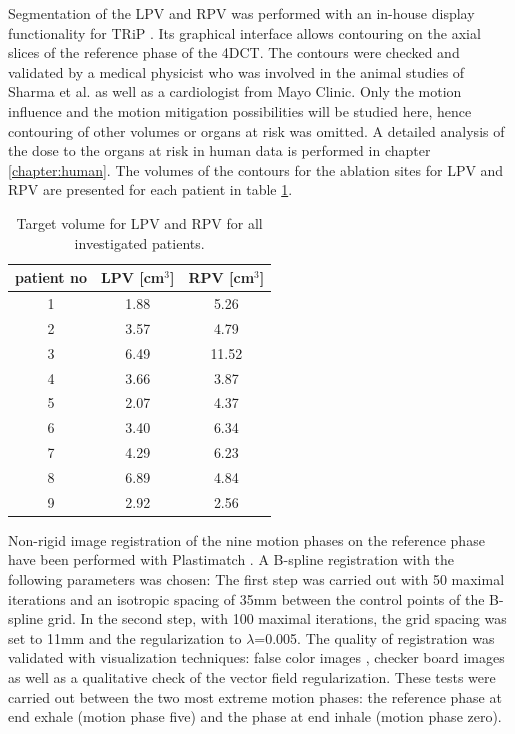 \newpage

Segmentation of the LPV and RPV was performed with an in-house display functionality for TRiP \cite{Hil09}. Its graphical interface 
allows contouring on the axial slices of the reference phase of the 4DCT. The contours were checked and validated by a medical physicist 
who was involved in the animal studies of Sharma et al. \cite{Sha10} as well as a cardiologist from Mayo Clinic. Only the motion influence 
and the motion mitigation possibilities will be studied here, hence contouring of other volumes or organs at risk was omitted. A detailed 
analysis of the dose to the organs at risk in human data is performed in chapter \ref{chapter:human}. The volumes of the contours for the 
ablation sites for LPV and RPV are presented for each patient in table \ref{tab:volume}. 

\begin{table}[H]
  \centering
  \caption{Target volume for LPV and RPV for all investigated patients.}
  \begin{tabular}{|c|c|c|}
    \hline\hline
    patient no & LPV [cm$^{3}$] & RPV [cm$^{3}$]\\
    \hline
    1 & 1.88 & 5.26 \\
    2 & 3.57 & 4.79 \\
    3 & 6.49 & 11.52 \\
    4 & 3.66 & 3.87 \\
    5 & 2.07 & 4.37 \\
    6 & 3.40 & 6.34 \\
    7 & 4.29 & 6.23 \\
    8 & 6.89 & 4.84 \\
    9 & 2.92 & 2.56 \\
    \hline\hline
  \end{tabular}
  \label{tab:volume}
\end{table}

Non-rigid image registration of the nine motion phases on the reference phase have been performed with Plastimatch \cite{Sharp07, Shack10}. 
A B-spline registration with the following parameters was chosen: The first step was carried out with 50 maximal iterations and an isotropic 
spacing of 35mm between the control points of the B-spline grid. In the second step, with 100 maximal iterations, the grid 
spacing was set to 11mm and the regularization to $\lambda$=0.005. 
The quality of registration was validated with visualization techniques: false color images \cite{Bro07}, checker board images 
\cite{Bro07} as well as a qualitative check of the vector field regularization. These tests were carried out between the two most extreme 
motion phases: the reference phase at end exhale (motion phase five) and the phase at end inhale (motion phase zero).


